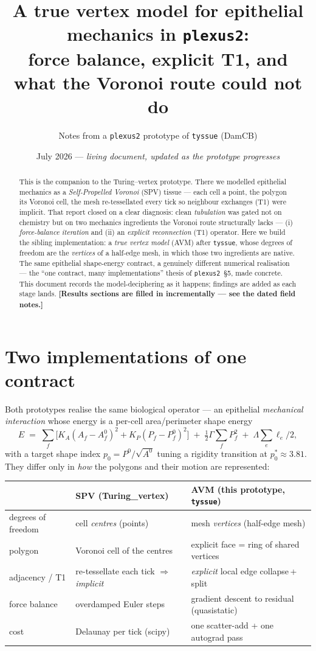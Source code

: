\documentclass[11pt]{article}
\title{\textbf{A true vertex model for epithelial mechanics in \texttt{plexus2}:\\
force balance, explicit T1, and what the Voronoi route could not do}}
\author{Notes from a \texttt{plexus2} prototype of \texttt{tyssue} (DamCB)}
\date{July 2026 --- \emph{living document, updated as the prototype progresses}}
\begin{document}
\maketitle

\begin{abstract}
\noindent
This is the companion to the Turing--vertex prototype. There we modelled epithelial mechanics
as a \emph{Self-Propelled Voronoi} (SPV) tissue --- each cell a point, the polygon its Voronoi
cell, the mesh re-tessellated every tick so neighbour exchanges (T1) were implicit. That report
closed on a clear diagnosis: clean \emph{tubulation} was gated not on chemistry but on two
mechanics ingredients the Voronoi route structurally lacks --- (i) \emph{force-balance iteration}
and (ii) an \emph{explicit reconnection} (T1) operator. Here we build the sibling implementation:
a \emph{true vertex model} (AVM) after \texttt{tyssue}, whose degrees of freedom are the
\emph{vertices} of a half-edge mesh, in which those two ingredients are native. The same
epithelial shape-energy contract, a genuinely different numerical realisation --- the ``one
contract, many implementations'' thesis of \texttt{plexus2}~\S5, made concrete. This document
records the model-deciphering as it happens; findings are added as each stage lands.
\textbf{[Results sections are filled in incrementally --- see the dated field notes.]}
\end{abstract}

\section{Two implementations of one contract}
Both prototypes realise the same biological operator --- an epithelial \emph{mechanical
interaction} whose energy is a per-cell area/perimeter shape energy
\[
E \;=\; \sum_f \Big[ K_A (A_f - A_f^0)^2 + K_P (P_f - P_f^0)^2 \Big]
        \;+\; \tfrac12\Gamma \sum_f P_f^2 \;+\; \Lambda \sum_e \ell_e/2 ,
\]
with a target shape index $p_0 = P^0/\sqrt{A^0}$ tuning a rigidity transition at
$p_0^\ast\!\approx\!3.81$. They differ only in \emph{how} the polygons and their motion are
represented:

\begin{center}
\renewcommand{\arraystretch}{1.3}
\begin{tabular}{@{}p{3.1cm}p{5.3cm}p{5.3cm}@{}}
\toprule
 & \textbf{SPV} (Turing\_vertex) & \textbf{AVM} (this prototype, \texttt{tyssue}) \\
\midrule
degrees of freedom & cell \emph{centres} (points) & mesh \emph{vertices} (half-edge mesh) \\
polygon & Voronoi cell of the centres & explicit face = ring of shared vertices \\
adjacency / T1 & re-tessellate each tick $\Rightarrow$ \emph{implicit} & \emph{explicit} local edge collapse\,+\,split \\
force balance & overdamped Euler steps & gradient descent to residual (quasistatic) \\
cost & Delaunay per tick (scipy) & one scatter-add + one autograd pass \\
\bottomrule
\end{tabular}
\end{center}
\end{document}
